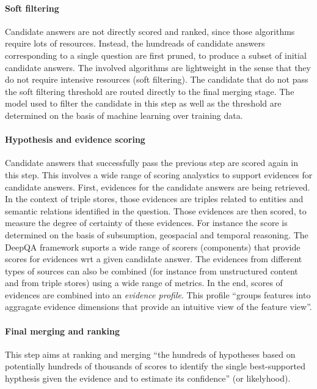 \documentclass[10pt,journal,letterpaper,compsoc]{IEEEtran}
\begin{document}
\paragraph{Soft filtering}
Candidate answers are not directly scored and ranked, since those algorithms 
require lots of resources. 
Instead, the hundreads of candidate answers corresponding to a single question
are first pruned, to produce a subset of initial candidate answers. The involved
algorithms are lightweight in the sense that they do not require intensive
resources (soft filtering).
The candidate that do not pass the soft filtering threshold are routed directly
to the final merging stage. 
The model used to filter the candidate in this step as well as the threshold are
determined on the basis of machine learning over training data. 


\paragraph{Hypothesis and evidence scoring}
Candidate answers that successfully pass the previous step are scored again in
this step. This involves a wide range of scoring analystics to support evidences
for candidate answers.
First, evidences for the candidate answers are being retrieved. In the context
of triple stores, those evidences are triples related to entities and semantic
relations identified in the question. Those evidences are then scored, to
measure the degree of certainty of these evidences. 
For instance the score is determined on the basis of subsumption, geospacial and
temporal reasoning.  
The {\sc DeepQA} framework suports a wide range of scorers
(components) that provide scores for evidences wrt a given candidate answer. 
The evidences from different types of sources can also be combined (for
instance from unstructured content and from triple stores) using a wide range of
metrics. 
In the end, scores of evidences are combined into an {\it evidence profile}.
This profile ``groups features into aggragate evidence dimensions that provide an
intuitive view of the feature view''. 

\paragraph{Final merging and ranking}
This step aims at ranking and merging ``the hundreds of hypotheses based on
potentially hundreds of thousands of scores to identify the single
best-supported hypthesis given the evidence and to estimate its confidence'' (or
likelyhood).
\end{document}
